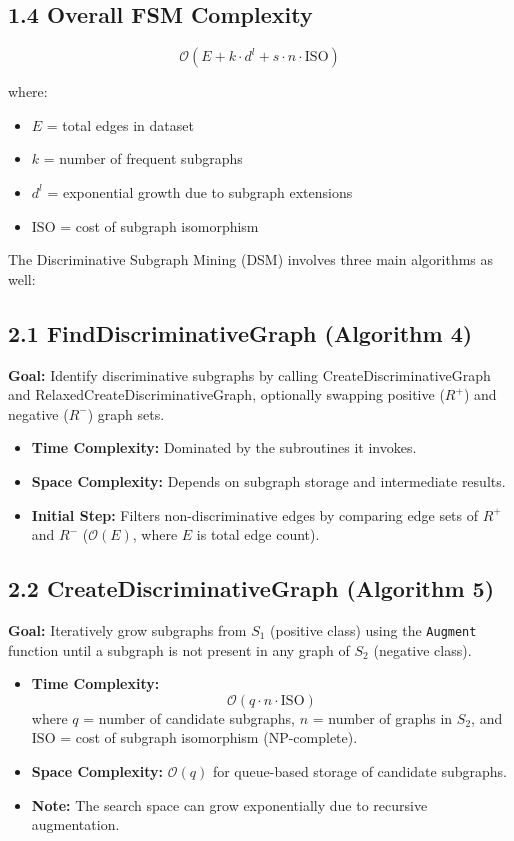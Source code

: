 \documentclass[10pt]{article}
\begin{document}
\subsection*{1.4 Overall FSM Complexity}

\[
\mathcal{O}(E + k \cdot d^l + s \cdot n \cdot \text{ISO})
\]

\noindent where:
\begin{itemize}[noitemsep]
    \item $E$ = total edges in dataset
    \item $k$ = number of frequent subgraphs
    \item $d^l$ = exponential growth due to subgraph extensions
    \item $\text{ISO}$ = cost of subgraph isomorphism
\end{itemize}
\vspace{1cm}
The Discriminative Subgraph Mining (DSM) involves three main algorithms as well:
\subsection*{2.1 FindDiscriminativeGraph (Algorithm 4)}
\textbf{Goal:} Identify discriminative subgraphs by calling CreateDiscriminativeGraph and RelaxedCreateDiscriminativeGraph, optionally swapping positive ($R^+$) and negative ($R^-$) graph sets.

\begin{itemize}[noitemsep]
    \item \textbf{Time Complexity:} Dominated by the subroutines it invokes.
    \item \textbf{Space Complexity:} Depends on subgraph storage and intermediate results.
    \item \textbf{Initial Step:} Filters non-discriminative edges by comparing edge sets of $R^+$ and $R^-$ ($\mathcal{O}(E)$, where $E$ is total edge count).
\end{itemize}

\subsection*{2.2 CreateDiscriminativeGraph (Algorithm 5)}
\textbf{Goal:} Iteratively grow subgraphs from $S_1$ (positive class) using the \texttt{Augment} function until a subgraph is not present in any graph of $S_2$ (negative class).

\begin{itemize}[noitemsep]
    \item \textbf{Time Complexity:} 
    \[
    \mathcal{O}(q \cdot n \cdot \text{ISO})
    \]
    where $q$ = number of candidate subgraphs, $n$ = number of graphs in $S_2$, and $\text{ISO}$ = cost of subgraph isomorphism (NP-complete).
    \item \textbf{Space Complexity:} $\mathcal{O}(q)$ for queue-based storage of candidate subgraphs.
    \item \textbf{Note:} The search space can grow exponentially due to recursive augmentation.
\end{itemize}
\end{document}
